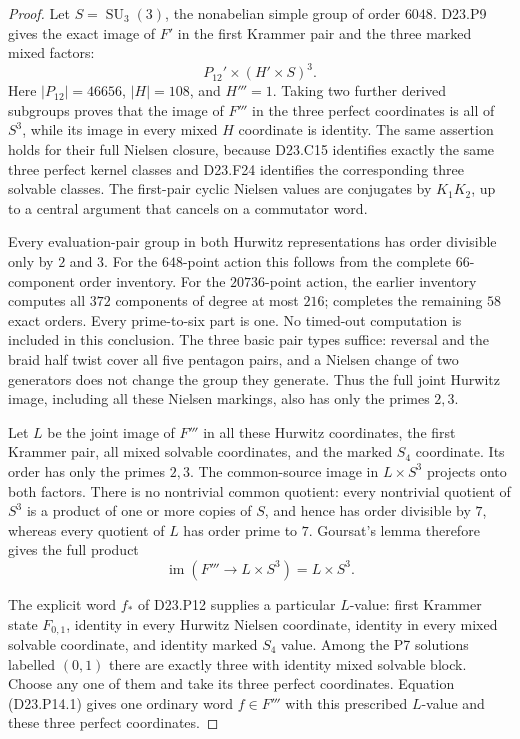 \begin{proof}
Let $S=\operatorname{SU}_3(3)$, the nonabelian simple group
of order $6048$. D23.P9 gives the exact image of $F'$ in the
first Krammer pair and the three marked mixed factors:
\[
 P_{12}'\times(H'\times S)^3.
\]
Here $|P_{12}|=46656$, $|H|=108$, and $H'''=1$.
Taking two further derived subgroups proves that the image
of $F'''$ in the three perfect coordinates is all of $S^3$,
while its image in every mixed $H$ coordinate is identity.
The same assertion holds for their full Nielsen closure,
because D23.C15 identifies exactly the same three perfect
kernel classes and D23.F24 identifies the corresponding
three solvable classes. The first-pair cyclic Nielsen values
are conjugates by $K_1K_2$, up to a central argument that
cancels on a commutator word.

Every evaluation-pair group in both Hurwitz representations
has order divisible only by $2$ and $3$. For the $648$-point
action this follows from the complete $66$-component order
inventory. For the $20736$-point action, the earlier inventory
computes all $372$ components of degree at most $216$;
 completes the remaining
$58$ exact orders. Every prime-to-six part is one.
No timed-out computation is included in this conclusion.
The three basic pair types suffice: reversal and the braid
half twist cover all five pentagon pairs, and a Nielsen
change of two generators does not change the group they
generate. Thus the full joint Hurwitz image, including all
these Nielsen markings, also has only the primes $2,3$.

Let $L$ be the joint image of $F'''$ in all these Hurwitz
coordinates, the first Krammer pair, all mixed solvable
coordinates, and the marked $S_4$ coordinate. Its order has
only the primes $2,3$. The common-source image in $L\times S^3$
projects onto both factors. There is no nontrivial common
quotient: every nontrivial quotient of $S^3$ is a product
of one or more copies of $S$, and hence has order divisible
by $7$, whereas every quotient of $L$ has order prime to $7$.
Goursat's lemma therefore gives the full product
\[
                 \operatorname{im}(F'''\to L\times S^3)
                    =L\times S^3.
\tag{D23.P14.1}
\]

The explicit word $f_*$ of D23.P12 supplies a particular
$L$-value: first Krammer state $F_{0,1}$, identity in every
Hurwitz Nielsen coordinate, identity in every mixed solvable
coordinate, and identity marked $S_4$ value. Among the P7
solutions labelled $(0,1)$ there are exactly three with
identity mixed solvable block. Choose any one of them and
take its three perfect coordinates. Equation (D23.P14.1)
gives one ordinary word $f\in F'''$ with this prescribed
$L$-value and these three perfect coordinates.


\end{proof}
